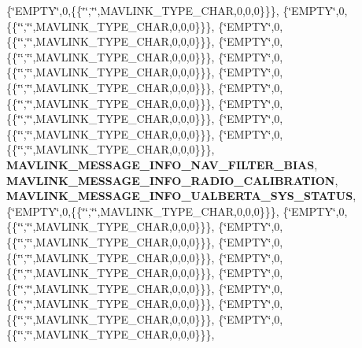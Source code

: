 \begin{DoxyCompactItemize}
\{\char`\"{}E\+M\+P\+TY\char`\"{},0,\{\{\char`\"{}\char`\"{},\char`\"{}\char`\"{},M\+A\+V\+L\+I\+N\+K\+\_\+\+T\+Y\+P\+E\+\_\+\+C\+H\+AR,0,0,0\}\}\}, \{\char`\"{}E\+M\+P\+TY\char`\"{},0,\{\{\char`\"{}\char`\"{},\char`\"{}\char`\"{},M\+A\+V\+L\+I\+N\+K\+\_\+\+T\+Y\+P\+E\+\_\+\+C\+H\+AR,0,0,0\}\}\}, \{\char`\"{}E\+M\+P\+TY\char`\"{},0,\{\{\char`\"{}\char`\"{},\char`\"{}\char`\"{},M\+A\+V\+L\+I\+N\+K\+\_\+\+T\+Y\+P\+E\+\_\+\+C\+H\+AR,0,0,0\}\}\}, \{\char`\"{}E\+M\+P\+TY\char`\"{},0,\{\{\char`\"{}\char`\"{},\char`\"{}\char`\"{},M\+A\+V\+L\+I\+N\+K\+\_\+\+T\+Y\+P\+E\+\_\+\+C\+H\+AR,0,0,0\}\}\}, \{\char`\"{}E\+M\+P\+TY\char`\"{},0,\{\{\char`\"{}\char`\"{},\char`\"{}\char`\"{},M\+A\+V\+L\+I\+N\+K\+\_\+\+T\+Y\+P\+E\+\_\+\+C\+H\+AR,0,0,0\}\}\}, \{\char`\"{}E\+M\+P\+TY\char`\"{},0,\{\{\char`\"{}\char`\"{},\char`\"{}\char`\"{},M\+A\+V\+L\+I\+N\+K\+\_\+\+T\+Y\+P\+E\+\_\+\+C\+H\+AR,0,0,0\}\}\}, \{\char`\"{}E\+M\+P\+TY\char`\"{},0,\{\{\char`\"{}\char`\"{},\char`\"{}\char`\"{},M\+A\+V\+L\+I\+N\+K\+\_\+\+T\+Y\+P\+E\+\_\+\+C\+H\+AR,0,0,0\}\}\}, \{\char`\"{}E\+M\+P\+TY\char`\"{},0,\{\{\char`\"{}\char`\"{},\char`\"{}\char`\"{},M\+A\+V\+L\+I\+N\+K\+\_\+\+T\+Y\+P\+E\+\_\+\+C\+H\+AR,0,0,0\}\}\}, \{\char`\"{}E\+M\+P\+TY\char`\"{},0,\{\{\char`\"{}\char`\"{},\char`\"{}\char`\"{},M\+A\+V\+L\+I\+N\+K\+\_\+\+T\+Y\+P\+E\+\_\+\+C\+H\+AR,0,0,0\}\}\}, \{\char`\"{}E\+M\+P\+TY\char`\"{},0,\{\{\char`\"{}\char`\"{},\char`\"{}\char`\"{},M\+A\+V\+L\+I\+N\+K\+\_\+\+T\+Y\+P\+E\+\_\+\+C\+H\+AR,0,0,0\}\}\}, \textbf{ M\+A\+V\+L\+I\+N\+K\+\_\+\+M\+E\+S\+S\+A\+G\+E\+\_\+\+I\+N\+F\+O\+\_\+\+N\+A\+V\+\_\+\+F\+I\+L\+T\+E\+R\+\_\+\+B\+I\+AS}, \textbf{ M\+A\+V\+L\+I\+N\+K\+\_\+\+M\+E\+S\+S\+A\+G\+E\+\_\+\+I\+N\+F\+O\+\_\+\+R\+A\+D\+I\+O\+\_\+\+C\+A\+L\+I\+B\+R\+A\+T\+I\+ON}, \textbf{ M\+A\+V\+L\+I\+N\+K\+\_\+\+M\+E\+S\+S\+A\+G\+E\+\_\+\+I\+N\+F\+O\+\_\+\+U\+A\+L\+B\+E\+R\+T\+A\+\_\+\+S\+Y\+S\+\_\+\+S\+T\+A\+T\+US}, \{\char`\"{}E\+M\+P\+TY\char`\"{},0,\{\{\char`\"{}\char`\"{},\char`\"{}\char`\"{},M\+A\+V\+L\+I\+N\+K\+\_\+\+T\+Y\+P\+E\+\_\+\+C\+H\+AR,0,0,0\}\}\}, \{\char`\"{}E\+M\+P\+TY\char`\"{},0,\{\{\char`\"{}\char`\"{},\char`\"{}\char`\"{},M\+A\+V\+L\+I\+N\+K\+\_\+\+T\+Y\+P\+E\+\_\+\+C\+H\+AR,0,0,0\}\}\}, \{\char`\"{}E\+M\+P\+TY\char`\"{},0,\{\{\char`\"{}\char`\"{},\char`\"{}\char`\"{},M\+A\+V\+L\+I\+N\+K\+\_\+\+T\+Y\+P\+E\+\_\+\+C\+H\+AR,0,0,0\}\}\}, \{\char`\"{}E\+M\+P\+TY\char`\"{},0,\{\{\char`\"{}\char`\"{},\char`\"{}\char`\"{},M\+A\+V\+L\+I\+N\+K\+\_\+\+T\+Y\+P\+E\+\_\+\+C\+H\+AR,0,0,0\}\}\}, \{\char`\"{}E\+M\+P\+TY\char`\"{},0,\{\{\char`\"{}\char`\"{},\char`\"{}\char`\"{},M\+A\+V\+L\+I\+N\+K\+\_\+\+T\+Y\+P\+E\+\_\+\+C\+H\+AR,0,0,0\}\}\}, \{\char`\"{}E\+M\+P\+TY\char`\"{},0,\{\{\char`\"{}\char`\"{},\char`\"{}\char`\"{},M\+A\+V\+L\+I\+N\+K\+\_\+\+T\+Y\+P\+E\+\_\+\+C\+H\+AR,0,0,0\}\}\}, \{\char`\"{}E\+M\+P\+TY\char`\"{},0,\{\{\char`\"{}\char`\"{},\char`\"{}\char`\"{},M\+A\+V\+L\+I\+N\+K\+\_\+\+T\+Y\+P\+E\+\_\+\+C\+H\+AR,0,0,0\}\}\}, \{\char`\"{}E\+M\+P\+TY\char`\"{},0,\{\{\char`\"{}\char`\"{},\char`\"{}\char`\"{},M\+A\+V\+L\+I\+N\+K\+\_\+\+T\+Y\+P\+E\+\_\+\+C\+H\+AR,0,0,0\}\}\}, \{\char`\"{}E\+M\+P\+TY\char`\"{},0,\{\{\char`\"{}\char`\"{},\char`\"{}\char`\"{},M\+A\+V\+L\+I\+N\+K\+\_\+\+T\+Y\+P\+E\+\_\+\+C\+H\+AR,0,0,0\}\}\}, 
\end{DoxyCompactItemize}
